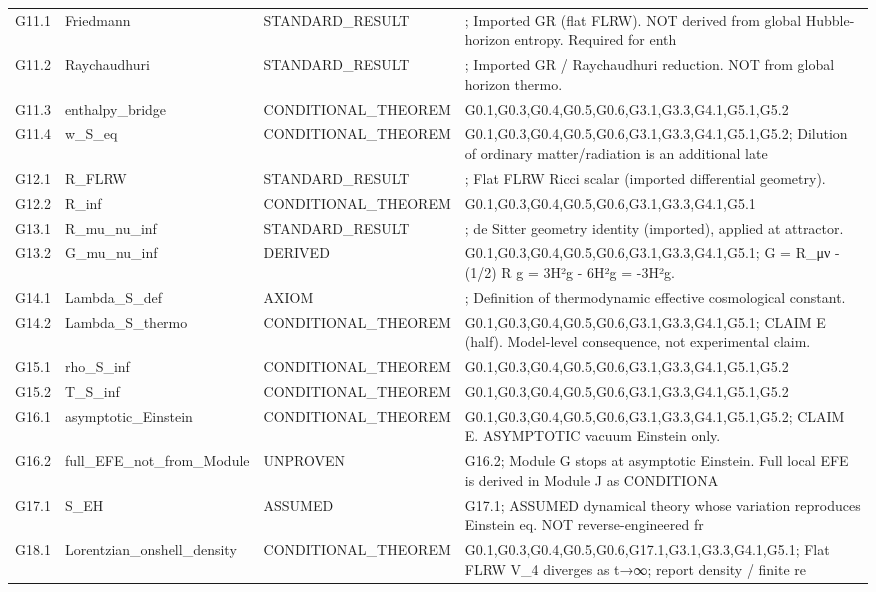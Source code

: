 \documentclass[11pt,a4paper]{article}
\theoremstyle{remark}\newtheorem*{caution}{Caution}
\begin{document}
{\begin{longtable}{@{}p{2.1cm}p{3.1cm}p{2.6cm}p{6cm}@{}}
G11.1 & Friedmann & STANDARD\_RESULT & ; Imported GR (flat FLRW). NOT derived from global Hubble-horizon entropy. Required for enth \\
G11.2 & Raychaudhuri & STANDARD\_RESULT & ; Imported GR / Raychaudhuri reduction. NOT from global horizon thermo. \\
G11.3 & enthalpy\_bridge & CONDITIONAL\_THEOREM & G0.1,G0.3,G0.4,G0.5,G0.6,G3.1,G3.3,G4.1,G5.1,G5.2 \\
G11.4 & w\_S\_eq & CONDITIONAL\_THEOREM & G0.1,G0.3,G0.4,G0.5,G0.6,G3.1,G3.3,G4.1,G5.1,G5.2; Dilution of ordinary matter/radiation is an additional late \\
G12.1 & R\_FLRW & STANDARD\_RESULT & ; Flat FLRW Ricci scalar (imported differential geometry). \\
G12.2 & R\_inf & CONDITIONAL\_THEOREM & G0.1,G0.3,G0.4,G0.5,G0.6,G3.1,G3.3,G4.1,G5.1 \\
G13.1 & R\_mu\_nu\_inf & STANDARD\_RESULT & ; de Sitter geometry identity (imported), applied at attractor. \\
G13.2 & G\_mu\_nu\_inf & DERIVED & G0.1,G0.3,G0.4,G0.5,G0.6,G3.1,G3.3,G4.1,G5.1; G = R\_μν - (1/2) R g = 3H²g - 6H²g = -3H²g. \\
G14.1 & Lambda\_S\_def & AXIOM & ; Definition of thermodynamic effective cosmological constant. \\
G14.2 & Lambda\_S\_thermo & CONDITIONAL\_THEOREM & G0.1,G0.3,G0.4,G0.5,G0.6,G3.1,G3.3,G4.1,G5.1; CLAIM E (half). Model-level consequence, not experimental claim. \\
G15.1 & rho\_S\_inf & CONDITIONAL\_THEOREM & G0.1,G0.3,G0.4,G0.5,G0.6,G3.1,G3.3,G4.1,G5.1,G5.2 \\
G15.2 & T\_S\_inf & CONDITIONAL\_THEOREM & G0.1,G0.3,G0.4,G0.5,G0.6,G3.1,G3.3,G4.1,G5.1,G5.2 \\
G16.1 & asymptotic\_Einstein & CONDITIONAL\_THEOREM & G0.1,G0.3,G0.4,G0.5,G0.6,G3.1,G3.3,G4.1,G5.1,G5.2; CLAIM E. ASYMPTOTIC vacuum Einstein only. \\
G16.2 & full\_EFE\_not\_from\_Module & UNPROVEN & G16.2; Module G stops at asymptotic Einstein. Full local EFE is derived in Module J as CONDITIONA \\
G17.1 & S\_EH & ASSUMED & G17.1; ASSUMED dynamical theory whose variation reproduces Einstein eq. NOT reverse-engineered fr \\
G18.1 & Lorentzian\_onshell\_density & CONDITIONAL\_THEOREM & G0.1,G0.3,G0.4,G0.5,G0.6,G17.1,G3.1,G3.3,G4.1,G5.1; Flat FLRW V\_4 diverges as t→∞; report density / finite re \\

\end{longtable}}
\end{document}
